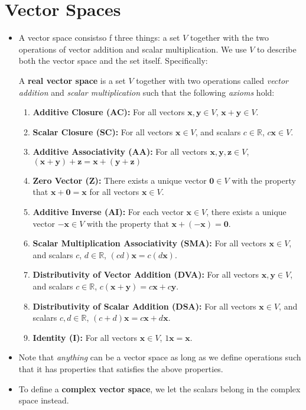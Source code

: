 \section{Vector Spaces}
\begin{itemize}
    \item A vector space consistso f three things: a set $V$ together with the two operations of vector addition and scalar multiplication. We use $V$ to describe both the vector space and the set itself. Specifically:
    \begin{definition}
        A \textbf{real vector space} is a set $V$ together with two operations called \textit{vector addition} and \textit{scalar multiplication} such that the following \textit{axioms} hold:
        \vspace{2mm}
        \begin{enumerate}
            \setlength\itemsep{1em}
            \item \textbf{Additive Closure (AC):} For all vectors $\bm{x}, \bm{y} \in V$, $\bm{x}+\bm{y} \in V$.
            \item \textbf{Scalar Closure (SC):} For all vectors $\bm{x} \in V$, and scalars $c \in \mathbb{R}$, $c\bm{x} \in V$.
            \item \textbf{Additive Associativity (AA):} For all vectors $\bm{x},\bm{y},\bm{z} \in V$, $(\bm{x}+\bm{y})+\bm{z} = \bm{x} + (\bm{y}+\bm{z})$
            \item \textbf{Zero Vector (Z):} There exists a unique vector $\bm{0} \in V$ with the property that $\bm{x}+\bm{0}=\bm{x}$ for all vectors $\bm{x} \in V$.
            \item \textbf{Additive Inverse (AI):} For each vector $\bm{x} \in V$, there exists a unique vector $-\bm{x} \in V$ with the property that $\bm{x} + (-\bm{x})=\bm{0}$.
            \item \textbf{Scalar Multiplication Associativity (SMA):} For all vectors $\bm{x} \in V$, and scalars $c$, $d\in \mathbb{R}$, $(cd)\bm{x} = c(d\bm{x})$.
            \item \textbf{Distributivity of Vector Addition (DVA):} For all vectors $\bm{x},\bm{y} \in V$, and scalars $c \in \mathbb{R}$, $c(\bm{x}+\bm{y})=c\bm{x}+c\bm{y}$.
            \item \textbf{Distributivity of Scalar Addition (DSA):} For all vectors $\bm{x} \in V$, and scalars $c,d \in \mathbb{R}$, $(c+d)\bm{x}=c\bm{x}+d\bm{x}$.
            \item \textbf{Identity (I):} For all vectors $\bm{x} \in V$, $1\bm{x} = \bm{x}$.
        \end{enumerate}
    \end{definition}
    \item Note that \textit{anything} can be a vector space as long as we define operations such that it has properties that satisfies the above properties.
    \item To define a \textbf{complex vector space}, we let the scalars belong in the complex space instead.
\end{itemize}